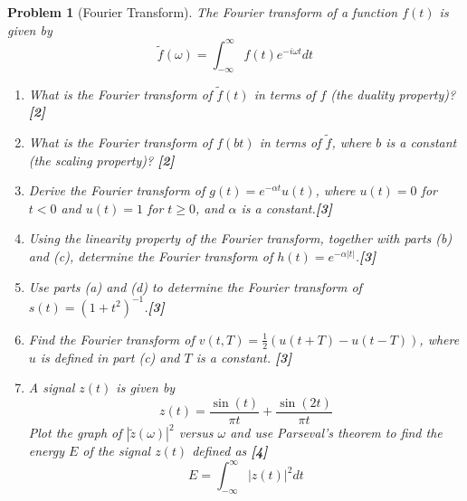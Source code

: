 \documentclass[a4paper]{article}
\theoremstyle{new}
\newtheorem{qns}{Problem}[section]
\begin{document}
\begin{qns}[Fourier Transform]
The Fourier transform of a function $f(t)$ is given by
$$\tilde{f}(\omega)=\int_{-\infty}^\infty f(t)e^{-i\omega t}dt$$
\begin{enumerate}[label=(\alph*)]
\item What is the Fourier transform of $\tilde{f}(t)$ in terms of $f$ (the duality property)?\hfill\textbf{[2]}
\item What is the Fourier transform of $f(bt)$ in terms of $\tilde{f}$, where $b$ is a constant (the scaling property)? \hfill\textbf{[2]}
\item Derive the Fourier transform of $g(t) = e^{-\alpha t}u(t)$, where $u(t) = 0$ for $t< 0$ and $u(t) = 1$ for $t\geq 0$, and $\alpha$ is a constant.\hfill\textbf{[3]}
\item Using the linearity property of the Fourier transform, together with parts (b) and (c), determine the Fourier transform of $h(t)=e^{-\alpha|t|}$.\hfill\textbf{[3]}
\item Use parts (a) and (d) to determine the Fourier transform of $s(t) = (1 + t^2)^{−1}$.\hfill\textbf{[3]}
\item Find the Fourier transform of $v(t, T) = \frac{1}{2} (u(t + T) − u(t − T))$, where $u$ is defined in part (c) and $T$ is a constant. \hfill\textbf{[3]}
\item A signal $z(t)$ is given by
$$z(t)=\frac{\sin(t)}{\pi t}+\frac{\sin(2t)}{\pi t}$$
Plot the graph of $|\tilde{z}(\omega)|^2$ versus $\omega$ and use Parseval’s theorem to find the energy $E$ of the signal $z(t)$ defined as \hfill\textbf{[4]}
$$E=\int_{-\infty}^\infty |z(t)|^2dt$$
\end{enumerate}
\end{qns}
\end{document}
